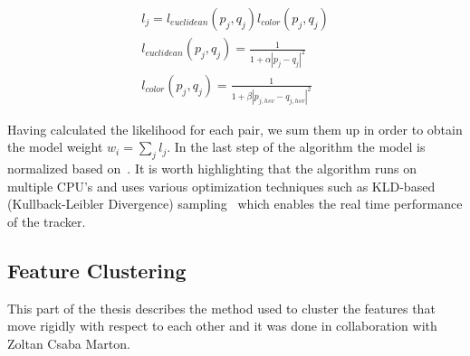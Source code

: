 \begin{eqnarray}
  l_{j} = l_{euclidean}(p_{j},q_{j})l_{color}(p_{j},q_{j}) \nonumber \\
  l_{euclidean}(p_{j},q_{j}) = \frac{1}{1+\alpha|p_{j}-q_{j}|^2} \nonumber \\
  l_{color}(p_{j},q_{j}) = \frac{1}{1+\beta|p_{j,hsv}-q_{j,hsv}|^2} 
  \label{eq:likelihood}
\end{eqnarray} 

Having calculated the likelihood for each pair, we sum them up in order to obtain the model weight $w_{i} = \sum\limits_{j}l_{j}$. In the last step of the algorithm the model is normalized based on~\cite{AzadMAD11}. It is worth highlighting that the algorithm runs on multiple CPU's and uses various optimization techniques such as KLD-based 
(Kullback-Leibler Divergence) sampling~\cite{Fox01KLD} which enables the real time performance of the tracker.


\subsection{Feature Clustering}

\label{sec:clustering}
 This part of the thesis describes the method used to cluster the features that move rigidly with respect to each other and it was done in collaboration with Zoltan Csaba Marton.

